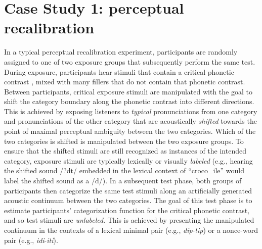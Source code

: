 \documentclass[
  11pt,
  man,floatsintext]{apa6}
\begin{document}
\hypertarget{sec:PR}{%
\section{Case Study 1: perceptual recalibration}\label{sec:PR}}

In a typical perceptual recalibration experiment, participants are randomly assigned to one of two exposure groups that subsequently perform the same test. During exposure, participants hear stimuli that contain a critical phonetic contrast \autocite[e.g., syllable-intial /d/ vs.~/t/, as in \emph{croco\emph{d}ile} or \emph{cafe\emph{t}eria},][]{kraljic-samuel2006}, mixed with many fillers that do not contain that phonetic contrast. Between participants, critical exposure stimuli are manipulated with the goal to shift the category boundary along the phonetic contrast into different directions. This is achieved by exposing listeners to \emph{typical} pronunciations from one category and pronunciations of the other category that are acoustically \emph{shifted} towards the point of maximal perceptual ambiguity between the two categories. Which of the two categories is shifted is manipulated between the two exposure groups. To ensure that the shifted stimuli are still recognized as instances of the intended category, exposure stimuli are typically lexically or visually \emph{labeled} (e.g., hearing the shifted sound /?dt/ embedded in the lexical context of ``croco\_ile'' would label the shifted sound as a /d/). In a subsequent test phase, both groups of participants then categorize the same test stimuli along an artificially generated acoustic continuum between the two categories. The goal of this test phase is to estimate participants' categorization function for the critical phonetic contrast, and so test stimuli are \emph{unlabeled}. This is achieved by presenting the manipulated continuum in the contexts of a lexical minimal pair (e.g., \emph{dip}-\emph{tip}) or a nonce-word pair (e.g., \emph{idi}-\emph{iti}).
\end{document}
